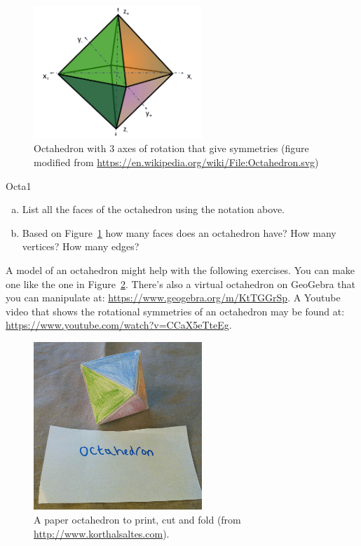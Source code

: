 \begin{figure}[ht]
\begin{center}
\includegraphics[width=2.5in]{images/AxesOfOctahedron.png}
\caption{\label{fig:OctaRot}Octahedron with 3 axes of rotation that give symmetries (figure modified from \url{https://en.wikipedia.org/wiki/File:Octahedron.svg})
}
\end{center}
\end{figure}


\begin{exercise}{Octa1}
\begin{enumerate}[(a)]
\item List all the faces of the octahedron using the notation above.
\item Based on Figure~\ref{fig:OctaRot}  how many faces does an octahedron have? How many vertices?  How many edges?
\end{enumerate}
\end {exercise}

A model of an octahedron might help with the following exercises.  You can make one like the one in Figure~\ref{fig:OctaFold}. There's also a virtual octahedron on GeoGebra that you can manipulate at: 
\url{https://www.geogebra.org/m/KtTGGrSp}.  A Youtube video that shows the rotational symmetries of an octahedron may be found at:
\url{https://www.youtube.com/watch?v=CCaX5eTteEg}.

\begin{figure}[ht]
\begin{center}
\includegraphics[width=2.5in]{images/OctahedronFold.png}
\caption{\label{fig:OctaFold} A paper octahedron to print, cut and fold
 (from \url{http://www.korthalsaltes.com}). }

\end{center}
\end{figure}

